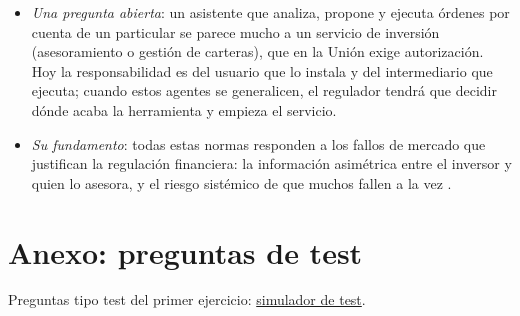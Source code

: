 \documentclass[11pt]{article}
\begin{document}
\begin{itemize}
\begin{itemize}
  \end{itemize}
\item \emph{Una pregunta abierta}: un asistente que analiza, propone y ejecuta órdenes por cuenta de un particular se parece mucho a un servicio de inversión (asesoramiento o gestión de carteras), que en la Unión exige autorización. Hoy la responsabilidad es del usuario que lo instala y del intermediario que ejecuta; cuando estos agentes se generalicen, el regulador tendrá que decidir dónde acaba la herramienta y empieza el servicio.
\item \emph{Su fundamento}: todas estas normas responden a los fallos de mercado que justifican la regulación financiera: la información asimétrica entre el inversor y quien lo asesora, y el riesgo sistémico de que muchos fallen a la vez .
\end{itemize}

\section{Anexo: preguntas de test}\label{anexo:test}

\begin{anotaciones}
Preguntas tipo test del primer ejercicio: \href{https://www.victorgutierrezmarcos.es/oposicion/temario/primer-ejercicio/test/simulador.html?tema=3.B.23}{simulador de test}.
\end{anotaciones}
\end{document}
